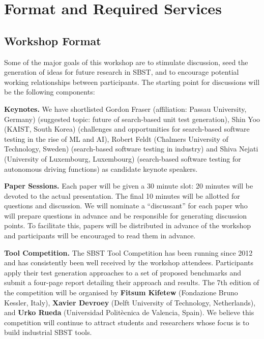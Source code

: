 \documentclass[10pt,conference]{IEEEtran}
\newcommand{\TODO}[1]{\textbf{\textcolor{ScarletRed}{[TODO: #1]}}\xspace}
\newcommand{\TODO}[1]{}
\begin{document}
\section{Format and Required Services}

\subsection{Workshop Format}

Some of the major goals of this workshop are to stimulate discussion,
seed the generation of ideas for future research in SBST, and to
encourage potential working relationships between participants.  The
starting point for discussions will be the following components:

{\bf Keynotes.}  We have shortlisted Gordon Fraser (affiliation:
Passau University, Germany) (suggested topic: future of search-based
unit test generation), Shin Yoo (KAIST, South Korea) (challenges and
opportunities for search-based software testing in the rise of ML and
AI), Robert Feldt (Chalmers University of Technology, Sweden)
(search-based software testing in industry) and Shiva Nejati
(University of Luxembourg, Luxembourg) (search-based software testing
for autonomous driving functions) as candidate keynote
speakers. %

{\bf Paper Sessions.}  Each paper will be given a 30
minute slot: 20 minutes will be devoted to the
actual presentation.  The final 10 minutes will be allotted for
questions and discussion.  We will nominate a ``discussant'' for each
paper who will prepare questions in advance and be responsible for
generating discussion points. To facilitate this, papers will be
distributed in advance of the workshop and participants will be
encouraged to read them in advance.

{\bf Tool Competition.} The SBST Tool Competition has been running
since 2012 and has consistently been well received by the workshop
attendees. Participants apply their test generation approaches to a
set of proposed benchmarks and submit a four-page report detailing
their approach and results. The 7th edition of the competition will be
organised by {\bf Fitsum Kifetew} (Fondazione Bruno Kessler, Italy),
{\bf Xavier Devroey} (Delft University of Technology, Netherlands),
and {\bf Urko Rueda} (Universidad Politècnica de Valencia, Spain). We
believe this competition will continue to attract students and
researchers whose focus is to build industrial SBST tools.
\end{document}
